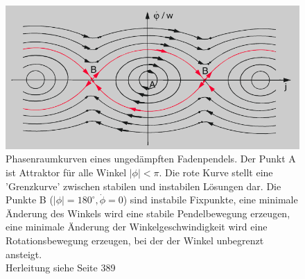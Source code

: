 \begin{figure}
\includegraphics[width=1.0\textwidth]{images/phasenraum2.png}
\caption{Phasenraumkurven eines ungedämpften Fadenpendels. Der Punkt A ist Attraktor für alle Winkel $|\phi|<\pi$. Die rote Kurve stellt eine 'Grenzkurve' zwischen stabilen und instabilen Lösungen dar. Die Punkte B ($|\phi|=180^{\circ}, \dot{\phi}=0$) sind instabile Fixpunkte, eine minimale Änderung des Winkels wird eine stabile Pendelbewegung erzeugen, eine minimale Änderung der Winkelgeschwindigkeit wird eine Rotationsbewegung erzeugen, bei der der Winkel unbegrenzt ansteigt. \\
Herleitung siehe \cite{troeder} Seite 389}
\label{pic:pendel_einfach}
\end{figure}
